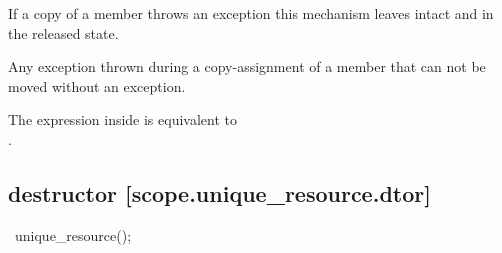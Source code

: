 \documentclass[ebook,11pt,article]{memoir}
\begin{document}
\begin{itemdescr}
%

\pnum
\begin{note}
If a copy of a member throws an exception this mechanism leaves  intact and  in the released state.
\end{note}

\pnum
\throws Any exception thrown during a copy-assignment of a member that can not be moved without an exception.

\pnum
\remarks
The expression inside  is equivalent to \\
 \tcode{\&\&} .
\end{itemdescr}


\subsection { destructor [scope.unique_resource.dtor]}

\begin{itemdecl}
~unique_resource();
\end{itemdecl}
\end{document}
